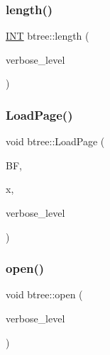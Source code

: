 \subsubsection{\texorpdfstring{length()}{length()}}
{\footnotesize\ttfamily \mbox{\hyperlink{galois_8h_a09fddde158a3a20bd2dcadb609de11dc}{I\+NT}} btree\+::length (\begin{DoxyParamCaption}\item[{\mbox{\hyperlink{galois_8h_a09fddde158a3a20bd2dcadb609de11dc}{I\+NT}}}]{verbose\+\_\+level }\end{DoxyParamCaption})}

\mbox{\label{classbtree_a29d23b8b151b6b793aa1184ca6ccc947}} 
\subsubsection{\texorpdfstring{Load\+Page()}{LoadPage()}}
{\footnotesize\ttfamily void btree\+::\+Load\+Page (\begin{DoxyParamCaption}\item[{\mbox{\hyperlink{discreta_8h_a4966414b761cd8d10ba385fe5e7c07fc}{Buffer}} $\ast$}]{BF,  }\item[{\mbox{\hyperlink{galois_8h_a09fddde158a3a20bd2dcadb609de11dc}{I\+NT}}}]{x,  }\item[{\mbox{\hyperlink{galois_8h_a09fddde158a3a20bd2dcadb609de11dc}{I\+NT}}}]{verbose\+\_\+level }\end{DoxyParamCaption})}

\mbox{\label{classbtree_a3e718949f1be6057839463292a60297a}} 
\subsubsection{\texorpdfstring{open()}{open()}}
{\footnotesize\ttfamily void btree\+::open (\begin{DoxyParamCaption}\item[{\mbox{\hyperlink{galois_8h_a09fddde158a3a20bd2dcadb609de11dc}{I\+NT}}}]{verbose\+\_\+level }\end{DoxyParamCaption})}

\mbox{\label{classbtree_a266447f479a8304c819768bbf0e7dd3d}} 
